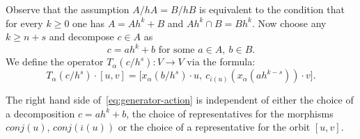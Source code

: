 \documentclass[oneside, 11pt]{amsart} \pdfoutput=1
\begin{document}
Observe that the assumption $A/hA = B/hB$ is equivalent to the condition that for every $k \geq 0$ one has $A = Ah^k + B$ and $Ah^k \cap B = Bh^k$. Now choose any $k \geq n + s$ and decompose $c \in A$ as
 \begin{equation} \label{eq:decomp} c = ah^k + b\text{ for some }a \in A,\ b \in B. \end{equation}
We define the operator $T_\alpha(c/h^s) \colon V \to V$ via the formula:
\begin{equation}\label{eq:generator-action}
\textstyle
T_\alpha(c/{h^s}) \cdot [u, v] = \bigl[x_\alpha(b/{h^s})\cdot u,\ c_{\overline{\iota}(u)}(x_\alpha(ah^{k - s})) \cdot v\bigr].
\end{equation}
\begin{lemma}\label{well-def}
The right hand side of~\eqref{eq:generator-action} is independent of either the choice of a decomposition $c = ah^k + b$, the choice of representatives for the morphisms $conj(u)$, $conj(\overline{\iota}(u))$ or the choice of a representative for the orbit $[u, v]$.
\end{lemma}
\end{document}

